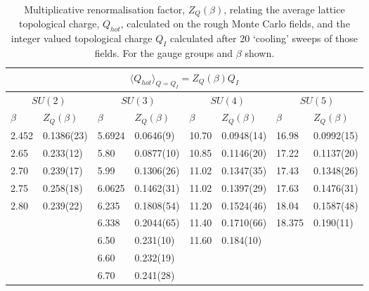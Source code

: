 \documentclass[12pt]{article}
\begin{document}
\begin{table}[htb]
\centering
\begin{tabular}{|ll|ll|ll|ll|} \hline
\multicolumn{8}{|c|}{$\langle{Q}_{hot}\rangle_{Q=Q_I} = Z_Q(\beta) Q_I$} \\ \hline
\multicolumn{2}{|c|}{$SU(2)$} &\multicolumn{2}{|c|}{$SU(3)$} & \multicolumn{2}{|c|}{$SU(4)$} & \multicolumn{2}{|c|}{$SU(5)$} \\ \hline
$\beta$ & $Z_Q(\beta)$ & $\beta$ & $Z_Q(\beta)$ & $\beta$ & $Z_Q(\beta)$ & $\beta$ & $Z_Q(\beta)$  \\ \hline
2.452 & 0.1386(23) &  5.6924 & 0.0646(9)  & 10.70 & 0.0948(14) & 16.98  & 0.0992(15) \\
2.65  & 0.233(12)  &  5.80   & 0.0877(10) & 10.85 & 0.1146(20) & 17.22  & 0.1137(20) \\
2.70  & 0.239(17)  &  5.99   & 0.1306(26) & 11.02 & 0.1347(35) & 17.43  & 0.1348(26) \\
2.75  & 0.258(18)  &  6.0625 & 0.1462(31) & 11.02 & 0.1397(29) & 17.63  & 0.1476(31) \\
2.80  & 0.239(22)  &  6.235  & 0.1808(54) & 11.20 & 0.1524(46) & 18.04  & 0.1587(48) \\
      &            &  6.338  & 0.2044(65) & 11.40 & 0.1710(66) & 18.375 & 0.190(11) \\
      &            &  6.50   & 0.231(10)  & 11.60 & 0.184(10)  &  &  \\
      &            &  6.60   & 0.232(19)  &  &  &  &  \\
      &            &  6.70   & 0.241(28)  &  &  &  &  \\ \hline
\end{tabular}
\caption{Multiplicative renormalisation factor, $Z_Q(\beta)$, relating 
  the average lattice topological charge, $Q_{hot}$,  calculated on the rough
  Monte Carlo fields, and the integer valued topological charge $Q_I$ calculated
  after 20 `cooling' sweeps of those fields. For the gauge groups and $\beta$ shown.}
\label{table_ZQA}
\end{table}
\end{document}
